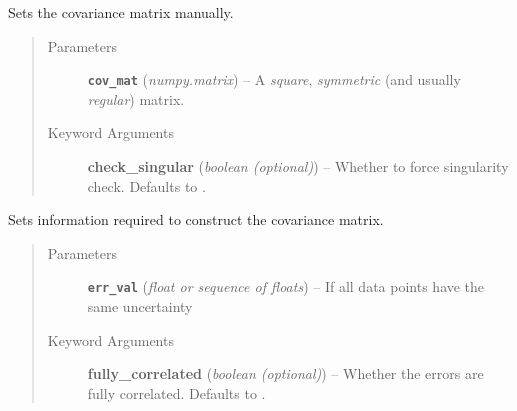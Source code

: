 \documentclass[a4paper,10pt,english]{sphinxmanual}
\begin{document}
\begin{fulllineitems}
\begin{fulllineitems}
\begin{quote}
\begin{description}
\end{description}\end{quote}

\end{fulllineitems}


\begin{fulllineitems}
\label{index:kafe.dataset.ErrorSource.make_from_matrix}
Sets the covariance matrix manually.
\begin{quote}\begin{description}
\item[{Parameters}] \leavevmode
\textbf{\texttt{cov\_mat}} (\emph{numpy.matrix}) -- A \emph{square}, \emph{symmetric} (and usually \emph{regular}) matrix.

\item[{Keyword Arguments}] \leavevmode
\textbf{check\_singular} (\emph{boolean (optional)}) --
Whether to force singularity check. Defaults to .

\end{description}\end{quote}

\end{fulllineitems}


\begin{fulllineitems}
\label{index:kafe.dataset.ErrorSource.make_from_val}
Sets information required to construct the covariance matrix.
\begin{quote}\begin{description}
\item[{Parameters}] \leavevmode
\textbf{\texttt{err\_val}} (\emph{float or sequence of floats}) -- If all data points have the same uncertainty

\item[{Keyword Arguments}] \leavevmode
\textbf{fully\_correlated} (\emph{boolean (optional)}) --
Whether the errors are fully correlated. Defaults to .

\end{description}\end{quote}

\end{fulllineitems}


\end{fulllineitems}
\end{document}

